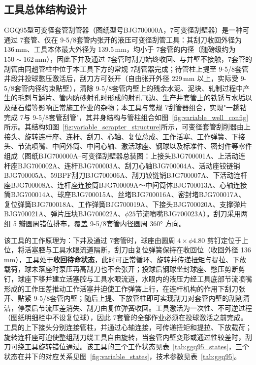 \subsection{工具总体结构设计}
\label{kebianjingguaguan}
GGQ95型可变径套管刮管器（图纸型号BJG700000A，7\inch 可变径刮壁器）是一种可通过 7\inch 套管、仅在 9-5/8\inch 套管内张开的液压可变径刮管工具：其刮刀收回外径为 136\,mm、工具本体最大外径为 139.5\,mm，均小于 7\inch 套管的内径（随磅级约为 $150\sim162$\,mm），因此下井及通过 7\inch 套管时刮刀始终收回、与井壁不接触，7\inch 套管的刮管由同趟管柱中位于本工具下方的常规 7\inch 刮管器完成；待管柱上提至 9-5/8\inch 套管井段并投球憋压激活后，刮刀方可张开（自由张开外径 229\,mm 以上，实际受 9-5/8\inch 套管内径约束贴壁），清除 9-5/8\inch 套管内壁上的残余水泥、泥块、轧制过程中产生的毛刺与鳞片、管内防砂射孔时形成的射孔飞边、生产井套管上的铁锈与水垢以及硬石蜡等影响正常施工作业的杂物；本工具与常规 7\inch 刮管器组合，实现"一趟钻完成 7\inch 与 9-5/8\inch 套管刮管"，其井身结构与管柱组合如图~\ref{fig:variable_well_config}所示。其结构如图~\ref{fig:variable_scrapter_structure}所示，可变径套管刮削器由上接头、旋转连杆座、连杆、刮刀、心轴、复位总成、工作活塞、工作弹簧、下接头、节流喷嘴、中间外筒、中间心轴、激活球座、钢球以及标准件、密封件等零件组成（图纸BJG700000A--可变径刮壁器总装图：上接头BJG700001A、上活动连杆座BJG700002A、连杆BJG700003A、刮刀心轴BJG700004A、活动座铰链销BJG700005A、59BPF刮刀BJG700006A、刮刀铰链销BJG700007A、下活动连杆座BJG700008A、连杆座连接筒BJG700009A～中间筒体BJG700013A、心轴连接筒BJG700014A、球座BJG700015A、丝堵BJG700016A、密封堵BJG700017A、复位弹簧BJG700018A、工作弹簧BJG700019A、下接头BJG700020A、支撑弹片BJG700021A、弹片压块BJG700022A、$\phi 25$节流喷嘴BJG700023A）。刮刀采用两组 5 瓣圆周错位排布，覆盖 9-5/8\inch 套管内径圆周 360° 方向。

该工具的工作原理为：下井及通过 7\inch 套管时，球座由圆周 $4\times\phi 4.80$ 剪钉定位于上位，将活塞腔与工具水眼流道隔断，刮刀由复位弹簧保持在收回位（收回外径 136\,mm），工具处于\textbf{收回待命状态}，此时可正常循环、旋转并传递扭矩与提拉、下放载荷，球未落座时泵压再高刮刀也不会张开；投球后钢球坐封球座、憋压剪断剪钉，球座下移并建立活塞腔与工具水眼流道，水眼内的液压力经工具底部节流喷嘴形成的工作压差推动工作活塞并迫使工作弹簧上行，在连杆机构的作用下刮刀张开、贴紧 9-5/8\inch 套管内壁；随后上提、下放管柱即可实现刮刀对套管内壁的刮削清洁，停泵后节流压差消失、刮刀由复位弹簧收回。工具激活为一次性、不可逆过程（图纸明细栏中不设复位球），因此 7\inch 套管的全部作业必须在投球激活之前完成。工具的上下接头分别连接管柱，并通过心轴连接，可传递扭矩和提拉、下放载荷；旋转连杆座可迫使整组刮刀绕工具自由旋转，当套管内壁变形或通过性较差时，刮刀可绕工具旋转错位通过。该工具的三个工作状态见表~\ref{tab:ggq95_states}，三个状态在井下的对应关系见图~\ref{fig:variable_states}，技术参数见表~\ref{tab:ggq95}。

